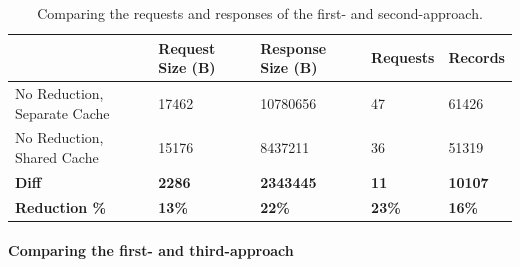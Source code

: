 \documentclass[MSE,Master,english]{twbook}%
\begin{document}
\ifshowTables
\begin{table}[H]
    \begin{tabular}{|l|l|l|l|l|}
    \hline
      & Request Size (B) & Response Size (B) & Requests & Records \\
    \hline
     No Reduction, Separate Cache & 17462 & 10780656 & 47 & 61426 \\
     \hline
     No Reduction, Shared Cache & 15176 & 8437211 & 36 & 51319 \\
     \hline
     \hline
     \textbf{Diff} & \textbf{2286} & \textbf{2343445} & \textbf{11} & \textbf{10107} \\
     \hline
     \textbf{Reduction \%} & \textbf{13\%} & \textbf{22\%} & \textbf{23\%} & \textbf{16\%} \\
     \hline
    \end{tabular}
    \caption{Comparing the requests and responses of the first- and second-approach.}
    \label{table:results:size-comparison-first-path-no-cache-no-reduction-cache-no-reduction}
\end{table}
\fi

\ifshowUnusedContent


\fi

\paragraph{Comparing the first- and third-approach}
\end{document}
